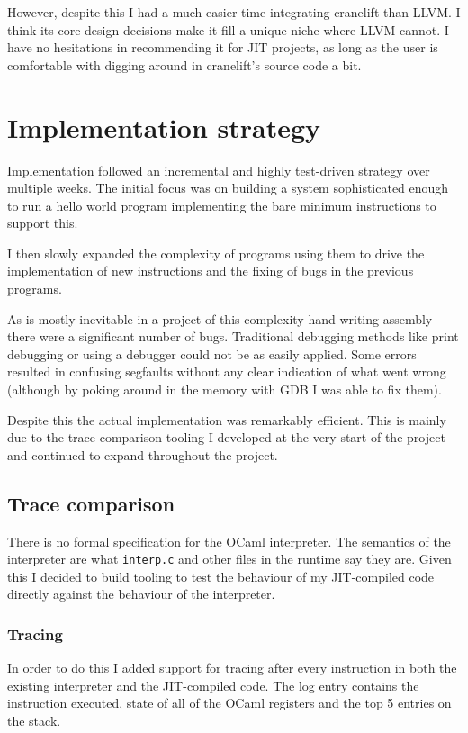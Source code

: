 However, despite this I had a much easier time integrating cranelift than LLVM. I think its core
design decisions make it fill a unique niche where LLVM cannot. I have no hesitations in
recommending it for JIT projects, as long as the user is comfortable with digging around in
cranelift's source code a bit.

\section{Implementation strategy} \label{impl-strategy}

Implementation followed an incremental and highly test-driven strategy over multiple weeks. The
initial focus was on building a system sophisticated enough to run a hello world program
implementing the bare minimum instructions to support this.

I then slowly expanded the complexity of programs using them to drive the implementation of new
instructions and the fixing of bugs in the previous programs.

As is mostly inevitable in a project of this complexity hand-writing assembly there were a
significant number of bugs. Traditional debugging methods like print debugging or using a debugger
could not be as easily applied. Some errors resulted in confusing segfaults without any clear
indication
of what went wrong (although by poking around in the memory with GDB I was able to fix them).

Despite this the actual implementation was remarkably efficient. This is mainly due to the trace
comparison tooling I developed at the very start of the project and continued to expand throughout
the project.

\subsection{Trace comparison} \label{tracing}

There is no formal specification for the OCaml interpreter. The semantics of the interpreter are
what
\texttt{interp.c} and other files in the runtime say they are. Given this I decided to build
tooling to test the behaviour of my JIT-compiled code directly against the behaviour of the
interpreter.

\subsubsection{Tracing}

In order to do this I added support for tracing after every instruction in both the existing
interpreter and the JIT-compiled code. The log entry contains the instruction executed, state of
all of the OCaml registers and the top 5 entries on the stack.

